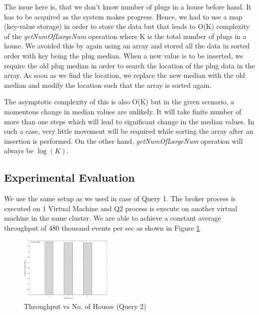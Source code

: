 The issue here is, that we don't know number of plugs in a house before hand.
It has to be acquired as the system makes progress.
Hence, we had to use a map (key-value storage) in order to store the data but that leads to O(K) complexity of the \textit{getNumOfLargeNum} operation where K is the total number of plugs in a house.
We avoided this by again using an array and stored all the data in sorted order with key being the plug median.
When a new value is to be inserted, we require the old plug median in order to search the location of the plug data in the array.
As soon as we find the location, we replace the new median with the old median and modify the location such that the array is sorted again.

The asymptotic complexity of this is also O(K) but in the given scenario, a momentous change in median values are unlikely.
It will take finite number of more than one steps which will lead to significant change in the median values.
In such a case, very little movement will be required while sorting the array after an insertion is performed.
On the other hand, \textit{getNumOfLargeNum} operation will always be $\log(K)$.


 
\subsection{Experimental Evaluation}
We use the same setup as we used in case of Query 1.
The broker process is executed on 1 Virtual Machine and Q2 process is execute on another virtual machine in the same cluster.
We are able to achieve a constant average throughput of 480 thousand events per sec as shown in Figure \ref{fig:q2_throughput}

\begin{figure}[h]
\begin{center}
	\includegraphics[width=0.4\textwidth]{img/q2_throughput}
	\vspace*{-0.4cm}
	\caption{Throughput vs No.
of Houses (Query 2) \label{fig:q2_throughput}}
\end{center}
\end{figure}


